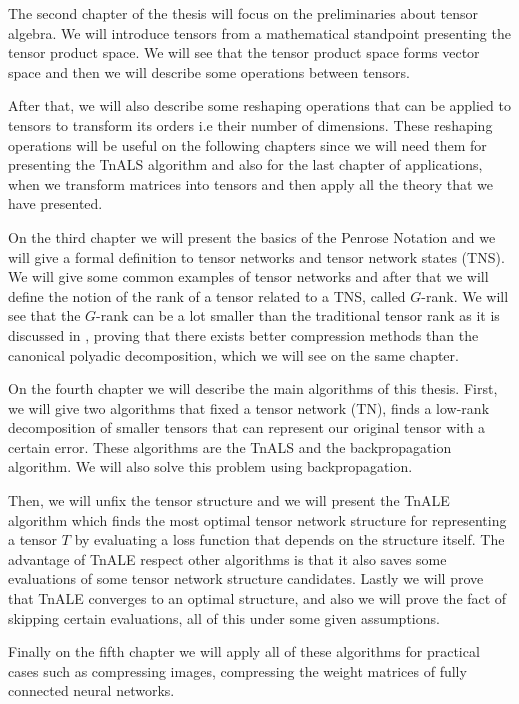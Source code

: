 \documentclass[11pt,a4paper,openright,oneside]{book}
\numberwithin{equation}{section}
\begin{document}

The second chapter of the thesis will focus on the preliminaries about tensor algebra. We will introduce 
tensors from a mathematical standpoint presenting the tensor product space.
We will see that the tensor product space forms vector space and then we will describe
some operations between tensors.

After that, we will also describe some reshaping operations that can be applied to tensors to transform its
orders i.e their number of dimensions. These reshaping operations will be useful on the following chapters
since we will need them for presenting the TnALS algorithm and also for the last chapter of applications, when
we transform matrices into tensors and then apply all the theory that we have presented.

On the third chapter we will present the basics of the Penrose Notation and we will give a formal
definition to tensor networks and tensor network states (\gls{TNS}). We will give some
common examples of tensor networks and after that we will define the notion
of the rank of a tensor related to a TNS, called $G$-rank. We will see that the $G$-rank can be a lot smaller
than the traditional tensor rank as it is discussed in \cite{yeTensorNetworkRanks2019},
proving that there exists better compression methods than the canonical
polyadic decomposition, which we will see on the same chapter.

On the fourth chapter we will describe the main algorithms of this thesis. First, we will give two algorithms
that fixed a tensor network (\gls{TN}), finds a low-rank decomposition of smaller tensors that can represent our original tensor
with a certain error. These algorithms are the \gls{TnALS} and the backpropagation algorithm.
We will also solve this problem using backpropagation.

Then, we will unfix the tensor structure and we will present the \gls{TnALE} algorithm which finds the most optimal
tensor network structure for representing a tensor $T$ by evaluating a loss function that depends on the
structure itself. The advantage of TnALE respect other algorithms
is that it also saves some evaluations of some tensor network structure candidates. Lastly we will prove
that \gls{TnALE} converges to an optimal structure, and also we will prove the fact of
skipping certain evaluations, all of this under some given assumptions.

Finally on the fifth chapter we will apply all of these algorithms for practical cases such as compressing images,
compressing the weight matrices of fully connected neural networks.
\end{document}
